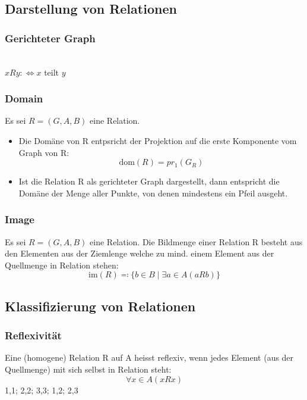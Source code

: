 \subsection{Darstellung von Relationen}
\subsubsection{Gerichteter Graph}
\gerichtet{}
\\$xRy: \Leftrightarrow x$ teilt $y$
\subsubsection{Domain}
Es sei $R = (G,A,B)$ eine Relation.
\begin{itemize}
    \item Die Domäne von R entpsricht der Projektion auf die erste Komponente vom Graph von R:
    \begin{equation}
        \text{dom}(R) = pr_{1}(G_R)
    \end{equation}
    \item Ist die Relation R als gerichteter Graph dargestellt, dann
    entspricht die Domäne der Menge aller Punkte, von denen
    mindestens ein Pfeil ausgeht.
\end{itemize}
\subsubsection{Image}
Es sei $R = (G,A,B)$ eine Relation. Die Bildmenge einer Relation R besteht aus den Elementen aus der Ziemlenge
welche zu  mind. einem Element aus der Quellmenge in Relation stehen:
\begin{equation}
    \text{im}(R) \eqqcolon \{b \in B \mid \exists{a} \in A (aRb)\}
\end{equation}

\subsection{Klassifizierung von Relationen} 
\subsubsection{Reflexivität}
Eine (homogene) Relation R auf A heisst reflexiv, wenn jedes
Element (aus der Quellmenge) mit sich selbst in Relation steht:
\begin{equation}
    \forall{x} \in A(xRx)
\end{equation}
{
1,1;
2,2;
3,3;
1,2;
2,3
}
